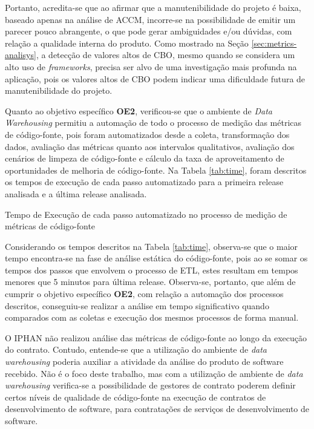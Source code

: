 Portanto, acredita-se que ao afirmar que a manutenibilidade do projeto é baixa, baseado apenas na análise de ACCM, incorre-se na possibilidade de emitir um parecer pouco abrangente, o que pode gerar ambiguidades e/ou dúvidas, com relação a qualidade interna do produto. Como mostrado na Seção \ref{sec:metrics-analisys}, a detecção de valores altos de CBO, mesmo quando se considera um alto uso de \textit{frameworks}, precisa ser alvo de uma investigação mais profunda na aplicação, pois os valores altos de CBO podem indicar uma dificuldade futura de manutenibilidade do projeto.

Quanto ao objetivo específico \textbf{OE2}, verificou-se que o ambiente de \textit{Data Warehousing} permitiu a automação de todo o processo de medição das métricas de código-fonte, pois foram automatizados desde a coleta, transformação dos dados, avaliação das métricas quanto aos intervalos qualitativos, avaliação dos cenários de limpeza de código-fonte e cálculo da taxa de aproveitamento de oportunidades de melhoria de código-fonte. Na Tabela \ref{tab:time}, foram descritos os tempos de execução de cada passo automatizado para a primeira release analisada e a última release analisada.

\begin{table}[!ht]
\centering

\caption{Tempo de Execução de cada passo automatizado no processo de medição de métricas de código-fonte}
\label{tab:time}
\end{table}
\FloatBarrier

Considerando os tempos descritos na Tabela \ref{tab:time}, observa-se que o maior tempo encontra-se na fase de análise estática do código-fonte, pois ao se somar os tempos dos passos que envolvem o processo de ETL, estes resultam em tempos menores que 5 minutos para última release. Observa-se, portanto, que além de cumprir o objetivo específico \textbf{OE2}, com relação a automação dos processos descritos, conseguiu-se realizar a análise em tempo significativo quando comparados com as coletas e execução dos mesmos processos de forma manual.

O IPHAN não realizou análise das métricas de código-fonte ao longo da execução do contrato. Contudo, entende-se que a utilização do ambiente de \textit{data warehousing} poderia auxiliar a atividade da análise do produto de software recebido. Não é o foco deste trabalho, mas com a utilização de ambiente de \textit{data warehousing} verifica-se a possibilidade de gestores de contrato poderem definir certos níveis de qualidade de código-fonte na execução de contratos de desenvolvimento de software, para contratações de serviços de desenvolvimento de software.  

